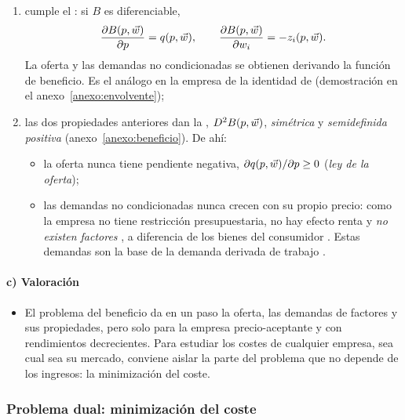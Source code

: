 \documentclass[11pt]{article}
\begin{document}
\begin{itemize}
\begin{enumerate}
  \item cumple el \nocite{Hotelling1932Edgeworth}: si $B$ es diferenciable,
    \begin{equation}
    \frac{\partial B(p,\vec{w})}{\partial p}=q(p,\vec{w}),\qquad \frac{\partial B(p,\vec{w})}{\partial w_i}=-z_i(p,\vec{w}). \label{eq:hotelling}
    \end{equation}
    La oferta y las demandas no condicionadas se obtienen derivando la función de beneficio. Es el análogo en la empresa de la identidad de  (demostración en el anexo~\ref{anexo:envolvente});
  \item las dos propiedades anteriores dan la , $D^2B(p,\vec{w})$, \emph{simétrica} y \emph{semidefinida positiva} (anexo~\ref{anexo:beneficio}). De ahí:
    \begin{itemize}
    \item la oferta nunca tiene pendiente negativa, $\partial q(p,\vec{w})/\partial p\geq 0$ (\emph{ley de la oferta});
    \item las demandas no condicionadas nunca crecen con su propio precio: como la empresa no tiene restricción presupuestaria, no hay efecto renta y \emph{no existen factores }, a diferencia de los bienes del consumidor . Estas demandas son la base de la demanda derivada de trabajo .
    \end{itemize}
  \end{enumerate}
\end{itemize}

\paragraph{c) Valoración}

\begin{itemize}
\item El problema del beneficio da en un paso la oferta, las demandas de factores y sus propiedades, pero solo para la empresa precio-aceptante y con rendimientos decrecientes. Para estudiar los costes de cualquier empresa, sea cual sea su mercado, conviene aislar la parte del problema que no depende de los ingresos: la minimización del coste.
\end{itemize}

\subsubsection{Problema dual: minimización del coste}\label{sec:problema-dual-minimizacion}
\end{document}
